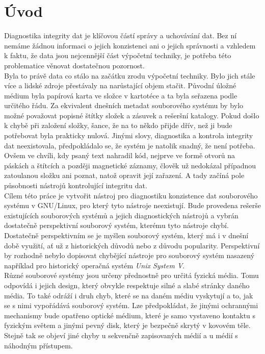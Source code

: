\chapter*{Úvod}
{}

Diagnostika integrity dat je klíčovou částí správy a uchovávání dat. Bez ní nemáme žádnou informaci o jejich konzistenci ani o jejich správnosti a vzhledem k faktu, že data jsou nejcennější část výpočetní techniky, je potřeba této problematice věnovat dostatečnou pozornost.\\
Byla to právě data co stálo na začátku zrodu výpočetní techniky. Bylo jich stále více a lidské zdroje přestávaly na narůstající objem stačit. Původní úložné médium byla papírová karta ve složce v kartotéce a ta byla seřazena podle určitého řádu. Za ekvivalent dnešních metadat souborového systému by bylo možné považovat popisné štítky složek a zásuvek a rešeršní katalogy. Pokud došlo k chybě při založení složky, šance, že na to někdo přijde dřív, než ji bude potřebovat byla prakticky nulová. Jinými slovy, diagnostika a kontrola integrity dat neexistovala, předpokládalo se, že systém je natolik snadný, že není potřeba. Ovšem ve chvíli, kdy psaný text nahradil kód, nejprve ve formě otvorů na páskách a štítcích a později magnetické záznamy, člověk už nedokázal případnou zatoulanou složku ani poznat, natož opravit její zařazení. A tady začíná pole působnosti nástrojů kontrolující integritu dat.\\ 
Cílem této práce je vytvořit nástroj pro diagnostiku konzistence dat souborového systému v \mbox{GNU/Linux}, pro který tyto nástroje neexistují. Bude provedena rešerše existujících souborových systémů a jejich diagnostických nástrojů a vybrán dostatečně perspektivní souborový systém, kterému tyto nástroje chybí. Dostatečně perspektivním se je myšlen souborový systém, který má i v dnešní době využití, ať už z historických důvodů nebo z důvodu popularity. Perspektivní by rozhodně nebylo dopisovat chybějící nástroje pro souborový systém nasazený například pro historický operačná systém \emph{Unix System V}.\\
Různé souborové systémy jsou určeny přednostně pro určitá fyzická média. Tomu odpovídá i jejich design, který obvykle respektuje silné a slabé stránky daného média. To také odráží i druh chyb, které se na daném médiu vyskytují a to, jak se s nimi vypořádává souborový systém. Lze předpokládat, že jinými ochrannými mechanismy bude opatřeno optické médium, které je samo vystaveno kontaktu s fyzickým světem a jinými pevný disk, který je bezpečně skrytý v kovovém těle. Stejně tak se objeví jiné chyby u sekvenčně zapisovaných médií a u médií s náhodným přístupem.\\
